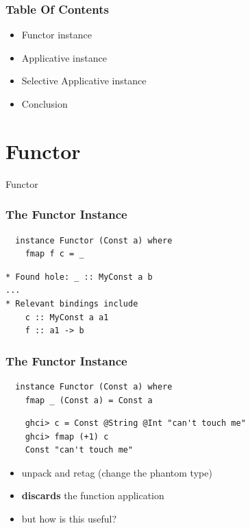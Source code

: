 \documentclass[aspectratio=169]{beamer}
\begin{document}
\begin{frame}
  \frametitle{Table Of Contents}
  \begin{itemize}
  \item Functor instance
  \item Applicative instance
  \item Selective Applicative instance
  \item Conclusion
  \end{itemize}
\end{frame}

\section{Functor}
\begin{frame}
  \begin{center}
    \Huge Functor
  \end{center}
\end{frame}

\begin{frame}[fragile]
  \frametitle{The Functor Instance}
  \begin{verbatim}
  instance Functor (Const a) where
    fmap f c = _
  \end{verbatim}
  \vspace{5mm}
  \begin{verbatim}
* Found hole: _ :: MyConst a b
...
* Relevant bindings include
    c :: MyConst a a1
    f :: a1 -> b
  \end{verbatim}
\end{frame}

\begin{frame}[fragile]
  \frametitle{The Functor Instance}
  \begin{verbatim}
  instance Functor (Const a) where
    fmap _ (Const a) = Const a
  \end{verbatim}
  \vspace{5mm}
  \begin{verbatim}
    ghci> c = Const @String @Int "can't touch me"
    ghci> fmap (+1) c
    Const "can't touch me"
  \end{verbatim}
  \vfill
  \begin{itemize}
  \item unpack and retag (change the phantom type)
  \item \textbf{discards} the function application
  \item but how is this useful?
  \end{itemize}
\end{frame}
\end{document}
